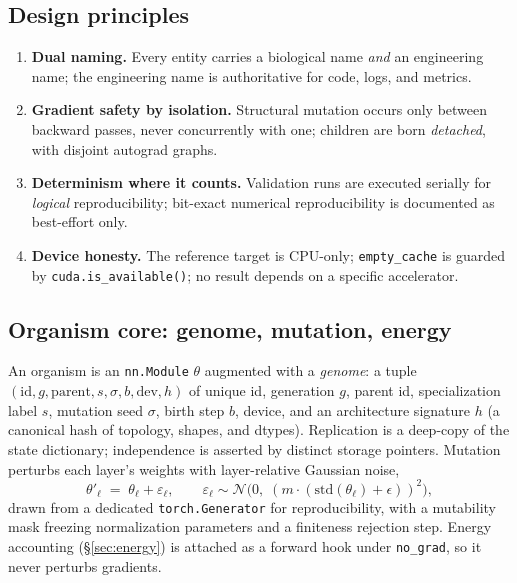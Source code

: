 \documentclass[11pt]{article}
\begin{document}
\subsection{Design principles}
\begin{enumerate}[leftmargin=1.4em,itemsep=2pt]
\item \textbf{Dual naming.} Every entity carries a biological name \emph{and} an
engineering name; the engineering name is authoritative for code, logs, and
metrics.
\item \textbf{Gradient safety by isolation.} Structural mutation occurs only
between backward passes, never concurrently with one; children are born
\emph{detached}, with disjoint autograd graphs.
\item \textbf{Determinism where it counts.} Validation runs are executed
serially for \emph{logical} reproducibility; bit-exact numerical reproducibility
is documented as best-effort only.
\item \textbf{Device honesty.} The reference target is CPU-only;
\texttt{empty\_cache} is guarded by \texttt{cuda.is\_available()}; no result
depends on a specific accelerator.
\end{enumerate}

\subsection{Organism core: genome, mutation, energy}
An organism is an \texttt{nn.Module} $\theta$ augmented with a \emph{genome}: a
tuple $(\mathrm{id}, g, \mathrm{parent}, s, \sigma, b, \mathrm{dev}, h)$ of unique
id, generation $g$, parent id, specialization label $s$, mutation seed $\sigma$,
birth step $b$, device, and an architecture signature $h$ (a canonical hash of
topology, shapes, and dtypes). Replication is a deep-copy of the state
dictionary; independence is asserted by distinct storage pointers. Mutation
perturbs each layer's weights with layer-relative Gaussian noise,
\begin{equation}
\theta'_\ell \;=\; \theta_\ell + \varepsilon_\ell,\qquad
\varepsilon_\ell \sim \mathcal{N}\!\big(0,\; (m\cdot(\mathrm{std}(\theta_\ell)+\epsilon))^2\big),
\end{equation}
drawn from a dedicated \texttt{torch.Generator} for reproducibility, with a
mutability mask freezing normalization parameters and a finiteness rejection
step. Energy accounting (\S\ref{sec:energy}) is attached as a forward hook under
\texttt{no\_grad}, so it never perturbs gradients.
\end{document}
